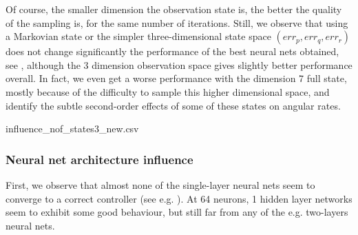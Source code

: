 \documentclass[anonymous=true,format=sigconf, screen=true, review=false]{acmart}
\begin{document}
Of course, the smaller dimension the observation state is, the better the quality of the sampling is, for the same number of iterations. %
Still, we observe that using a Markovian state or the simpler three-dimensional state space $(err_p,err_q,err_r)$ does not change significantly the performance of the best neural nets obtained, see , although the 3 dimension observation space gives slightly better performance overall. In fact, we even get a worse performance with the dimension 7 full state, mostly because of the difficulty to sample this higher dimensional space, and identify the subtle second-order effects of some of these states on angular rates.  %
\begin{csvtable*}{influence_nof_states3_new.csv}
\caption{Influence of the observable space dimension (all in \% except rising t. in seconds)}
\label{fig:influencedim}
\end{csvtable*}
\subsubsection{Neural net architecture influence}

First, we observe that almost none of the single-layer neural nets seem to converge to a correct controller (see e.g. ). At 64 neurons, 1 hidden layer networks seem to exhibit some good behaviour, but still far from any of the e.g. two-layers neural nets. 
\end{document}
